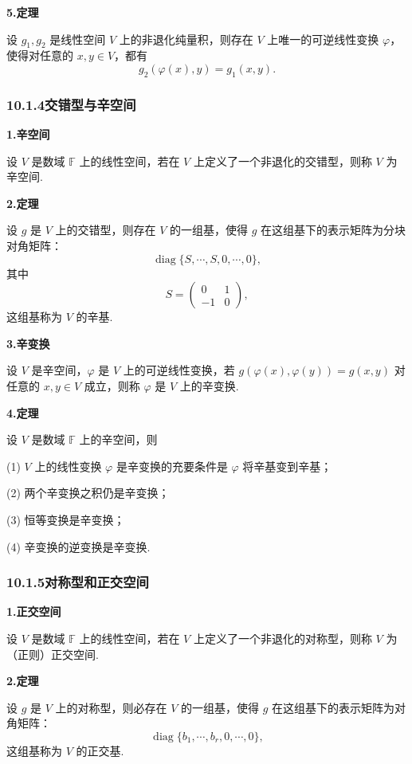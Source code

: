 \documentclass[UTF8,12pt,a4paper,fontset=fandol]{ctexart}
\begin{document}
\noindent\textbf{5.\quad 定理}

设 $g_1,g_2$ 是线性空间 $V$ 上的非退化纯量积，则存在 $V$ 上唯一的可逆线性变换 $\varphi$，使得对任意的 $x,y\in V$，都有
\[
g_2(\varphi(x),y)=g_1(x,y).
\]

\subsubsection*{10.1.4\quad 交错型与辛空间}

\noindent\textbf{1.\quad 辛空间}

设 $V$ 是数域 $\mathbb{F}$ 上的线性空间，若在 $V$ 上定义了一个非退化的交错型，则称 $V$ 为辛空间.

\noindent\textbf{2.\quad 定理}

设 $g$ 是 $V$ 上的交错型，则存在 $V$ 的一组基，使得 $g$ 在这组基下的表示矩阵为分块对角矩阵：
\[
\operatorname{diag}\{S,\cdots,S,0,\cdots,0\},
\]
其中
\[
S=\left(\begin{array}{cc}
0 & 1\\
-1 & 0
\end{array}\right),
\]
这组基称为 $V$ 的辛基.

\noindent\textbf{3.\quad 辛变换}

设 $V$ 是辛空间，$\varphi$ 是 $V$ 上的可逆线性变换，若 $g(\varphi(x),\varphi(y))=g(x,y)$ 对任意的 $x,y\in V$ 成立，则称 $\varphi$ 是 $V$ 上的辛变换.

\noindent\textbf{4.\quad 定理}

设 $V$ 是数域 $\mathbb{F}$ 上的辛空间，则

(1) $V$ 上的线性变换 $\varphi$ 是辛变换的充要条件是 $\varphi$ 将辛基变到辛基；

(2) 两个辛变换之积仍是辛变换；

(3) 恒等变换是辛变换；

(4) 辛变换的逆变换是辛变换.

\subsubsection*{10.1.5\quad 对称型和正交空间}

\noindent\textbf{1.\quad 正交空间}

设 $V$ 是数域 $\mathbb{F}$ 上的线性空间，若在 $V$ 上定义了一个非退化的对称型，则称 $V$ 为（正则）正交空间.

\noindent\textbf{2.\quad 定理}

设 $g$ 是 $V$ 上的对称型，则必存在 $V$ 的一组基，使得 $g$ 在这组基下的表示矩阵为对角矩阵：
\[
\operatorname{diag}\{b_1,\cdots,b_r,0,\cdots,0\},
\]
这组基称为 $V$ 的正交基.
\end{document}

